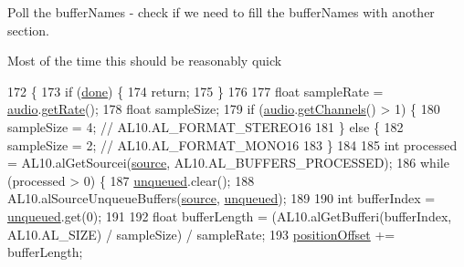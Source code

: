 Poll the buffer\+Names -\/ check if we need to fill the buffer\+Names with another section.

Most of the time this should be reasonably quick 
\begin{DoxyCode}
172                          \{
173         \textcolor{keywordflow}{if} (\mbox{\hyperlink{classorg_1_1newdawn_1_1slick_1_1openal_1_1_open_a_l_stream_player_a64962f56b4c366c19fe3c2bff2f55842}{done}}) \{
174             \textcolor{keywordflow}{return};
175         \}
176 
177         \textcolor{keywordtype}{float} sampleRate = \mbox{\hyperlink{classorg_1_1newdawn_1_1slick_1_1openal_1_1_open_a_l_stream_player_a694870dca2079ff6e6269a394a126d17}{audio}}.\mbox{\hyperlink{interfaceorg_1_1newdawn_1_1slick_1_1openal_1_1_audio_input_stream_a461c4ad4304ff8d75693c93e525e0f85}{getRate}}();
178         \textcolor{keywordtype}{float} sampleSize;
179         \textcolor{keywordflow}{if} (\mbox{\hyperlink{classorg_1_1newdawn_1_1slick_1_1openal_1_1_open_a_l_stream_player_a694870dca2079ff6e6269a394a126d17}{audio}}.\mbox{\hyperlink{interfaceorg_1_1newdawn_1_1slick_1_1openal_1_1_audio_input_stream_a2bee5322dd7878c18fa8f16bd52bbdfa}{getChannels}}() > 1) \{
180             sampleSize = 4; \textcolor{comment}{// AL10.AL\_FORMAT\_STEREO16}
181         \} \textcolor{keywordflow}{else} \{
182             sampleSize = 2; \textcolor{comment}{// AL10.AL\_FORMAT\_MONO16}
183         \}
184         
185         \textcolor{keywordtype}{int} processed = AL10.alGetSourcei(\mbox{\hyperlink{classorg_1_1newdawn_1_1slick_1_1openal_1_1_open_a_l_stream_player_abe9f7d1ac52a705aa359cf3eb1c69464}{source}}, AL10.AL\_BUFFERS\_PROCESSED);
186         \textcolor{keywordflow}{while} (processed > 0) \{
187             \mbox{\hyperlink{classorg_1_1newdawn_1_1slick_1_1openal_1_1_open_a_l_stream_player_a57522a0a0a5ef27a24b13672a7637174}{unqueued}}.clear();
188             AL10.alSourceUnqueueBuffers(\mbox{\hyperlink{classorg_1_1newdawn_1_1slick_1_1openal_1_1_open_a_l_stream_player_abe9f7d1ac52a705aa359cf3eb1c69464}{source}}, \mbox{\hyperlink{classorg_1_1newdawn_1_1slick_1_1openal_1_1_open_a_l_stream_player_a57522a0a0a5ef27a24b13672a7637174}{unqueued}});
189             
190             \textcolor{keywordtype}{int} bufferIndex = \mbox{\hyperlink{classorg_1_1newdawn_1_1slick_1_1openal_1_1_open_a_l_stream_player_a57522a0a0a5ef27a24b13672a7637174}{unqueued}}.get(0);
191 
192             \textcolor{keywordtype}{float} bufferLength = (AL10.alGetBufferi(bufferIndex, AL10.AL\_SIZE) / sampleSize) / sampleRate;
193             \mbox{\hyperlink{classorg_1_1newdawn_1_1slick_1_1openal_1_1_open_a_l_stream_player_a41556aeb2058a1c2dd04177e1d61d43c}{positionOffset}} += bufferLength;

\end{DoxyCode}
